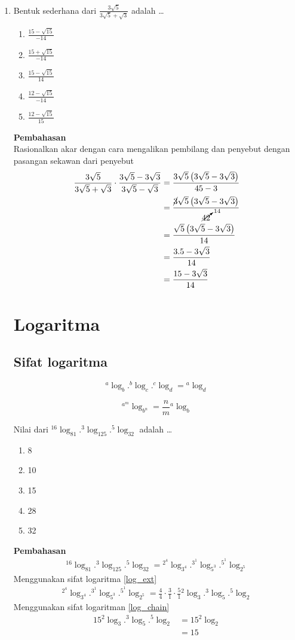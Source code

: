 \documentclass{report}
\newcommand{\options}[5]{
\begin{enumerate}[label=\alph*.]
	\item #1
	\item #2
	\item #3
	\item #4
	\item #5
\end{enumerate}
}
\newcommand{\pemb}{ \textbf{Pembahasan} \\}
\begin{document}
\begin{enumerate}
\item
Bentuk sederhana dari $\frac{3\sqrt{5}}{3\sqrt{5}+\sqrt{3}}$ adalah \ldots
\options
{$\frac{15-\sqrt{15}}{-14}$}
{$\frac{15+\sqrt{15}}{-14}$}
{$\frac{15-\sqrt{15}}{14}$}
{$\frac{12-\sqrt{15}}{-14}$}
{$\frac{12-\sqrt{15}}{15}$}
\pemb
Rasionalkan akar dengan cara mengalikan pembilang dan penyebut dengan pasangan sekawan dari penyebut
\begin{align*}
	\frac{3\sqrt{5}}{3\sqrt{5}+\sqrt{3}} \cdot \frac{3\sqrt{5}-3\sqrt{3}}{3\sqrt{5}-\sqrt{3}}
	&= \frac{3\sqrt{5}\left(3\sqrt{5}-3\sqrt{3}\right)}{45-3} \\
	&= \frac{\cancel{3}\sqrt{5}\left(3\sqrt{5}-3\sqrt{3}\right)}{\cancelto{14}{42}} \\
	&= \frac{\sqrt{5}\left(3\sqrt{5}-3\sqrt{3}\right)}{14} \\
	&= \frac{3.5-3\sqrt{3}}{14} \\
	&= \frac{15-3\sqrt{3}}{14}
\end{align*}

\chapter{Logaritma}
\section*{Sifat logaritma}

\begin{equation}
\label{log_chain}
{}^a\log_{b} . {}^b\log_{c} . {}^c\log_{d} = {}^a\log_{d}
\end{equation}

\begin{equation}
\label{log_ext}
{}^{{a}^{m}}\log_{b^{n}} = \frac{n}{m}{}^a\log_{ b}
\end{equation}

Nilai dari ${}^{16}\log_{81}.{}^{3}\log_{125}.{}^{5}\log_{32}$ adalah \ldots
\options
{8}
{10}
{15}
{28}
{32}
\pemb

\begin{align*}
	{}^{16}\log_{81}.{}^{3}\log_{125}.{}^{5}\log_{32} = {}^{2^{4}}\log_{3^{4}}.{}^{3^1}\log_{5^3}.{}^{5^1}\log_{2^5}
\end{align*}
Menggunakan sifat logaritma \ref{log_ext}
\begin{align*}
	{}^{2^{4}}\log_{3^{4}}.{}^{3^1}\log_{5^3}.{}^{5^1}\log_{2^5} = \frac{4}{4}\cdot\frac{3}{1}\cdot\frac{5}{1}{}^{2}\log_{3}.{}^{3}\log_{5}.{}^{5}\log_{2}
\end{align*}
Menggunakan sifat logaritman \ref{log_chain}
\begin{align*}
	15{}^{2}\log_{3}.{}^{3}\log_{5}.{}^{5}\log_{2} 
	&= 15 {}^{2}\log_{2} \\
	&= 15
\end{align*}


\end{enumerate}
\end{document}
